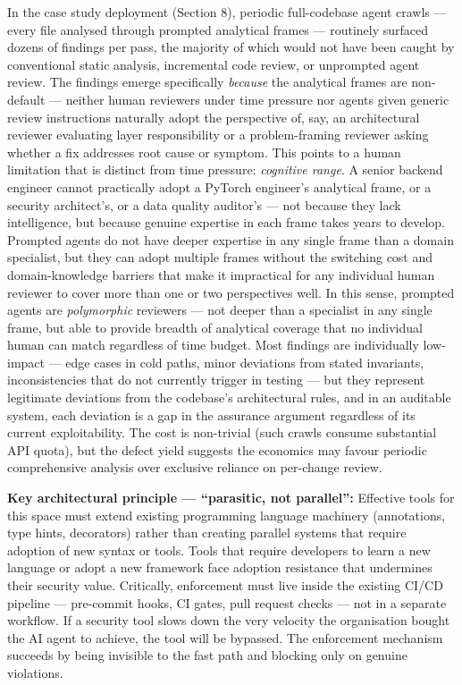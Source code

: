 \documentclass[a4paper,11pt]{report}
\begin{document}
In the case study deployment (Section 8), periodic full-codebase agent
crawls --- every file analysed through prompted analytical frames ---
routinely surfaced dozens of findings per pass, the majority of which
would not have been caught by conventional static analysis, incremental
code review, or unprompted agent review. The findings emerge
specifically \emph{because} the analytical frames are non-default ---
neither human reviewers under time pressure nor agents given generic
review instructions naturally adopt the perspective of, say, an
architectural reviewer evaluating layer responsibility or a
problem-framing reviewer asking whether a fix addresses root cause or
symptom. This points to a human limitation that is distinct from time
pressure: \emph{cognitive range}. A senior backend engineer cannot
practically adopt a PyTorch engineer's analytical frame, or a security
architect's, or a data quality auditor's --- not because they lack
intelligence, but because genuine expertise in each frame takes years to
develop. Prompted agents do not have deeper expertise in any single
frame than a domain specialist, but they can adopt multiple frames
without the switching cost and domain-knowledge barriers that make it
impractical for any individual human reviewer to cover more than one or
two perspectives well. In this sense, prompted agents are
\emph{polymorphic} reviewers --- not deeper than a specialist in any
single frame, but able to provide breadth of analytical coverage that no
individual human can match regardless of time budget. Most findings are
individually low-impact --- edge cases in cold paths, minor deviations
from stated invariants, inconsistencies that do not currently trigger in
testing --- but they represent legitimate deviations from the codebase's
architectural rules, and in an auditable system, each deviation is a gap
in the assurance argument regardless of its current exploitability. The
cost is non-trivial (such crawls consume substantial API quota), but the
defect yield suggests the economics may favour periodic comprehensive
analysis over exclusive reliance on per-change review.

\textbf{Key architectural principle --- ``parasitic, not parallel'':}
Effective tools for this space must extend existing programming language
machinery (annotations, type hints, decorators) rather than creating
parallel systems that require adoption of new syntax or tools. Tools
that require developers to learn a new language or adopt a new framework
face adoption resistance that undermines their security value.
Critically, enforcement must live inside the existing CI/CD pipeline ---
pre-commit hooks, CI gates, pull request checks --- not in a separate
workflow. If a security tool slows down the very velocity the
organisation bought the AI agent to achieve, the tool will be bypassed.
The enforcement mechanism succeeds by being invisible to the fast path
and blocking only on genuine violations.
\end{document}
